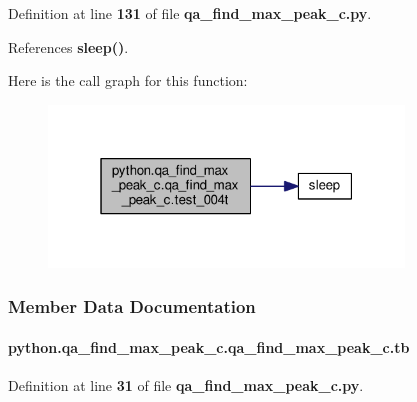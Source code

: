 Definition at line {\bf 131} of file {\bf qa\+\_\+find\+\_\+max\+\_\+peak\+\_\+c.\+py}.



References {\bf sleep()}.



Here is the call graph for this function\+:
\nopagebreak
\begin{figure}[H]
\begin{center}
\leavevmode
\includegraphics[width=268pt]{df/d83/classpython_1_1qa__find__max__peak__c_1_1qa__find__max__peak__c_aee45098f0169e031fd833c267282953d_cgraph}
\end{center}
\end{figure}




\subsubsection{Member Data Documentation}
\paragraph[{tb}]{\setlength{\rightskip}{0pt plus 5cm}python.\+qa\+\_\+find\+\_\+max\+\_\+peak\+\_\+c.\+qa\+\_\+find\+\_\+max\+\_\+peak\+\_\+c.\+tb}\label{classpython_1_1qa__find__max__peak__c_1_1qa__find__max__peak__c_a8e893e8ccb0e6de54e1e8a7a91b6fc55}


Definition at line {\bf 31} of file {\bf qa\+\_\+find\+\_\+max\+\_\+peak\+\_\+c.\+py}.



